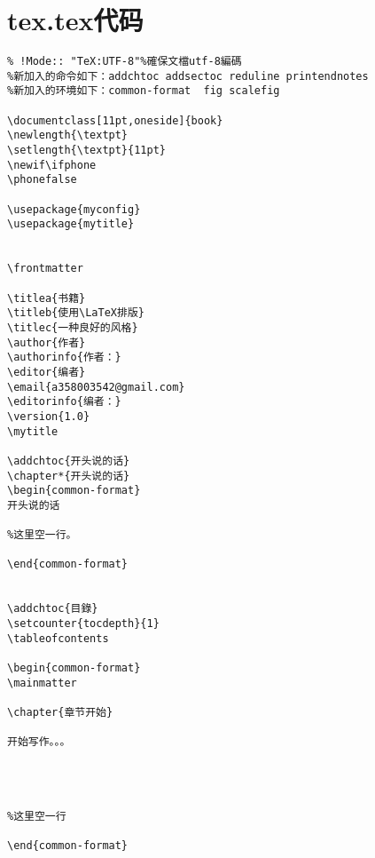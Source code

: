 \section{tex.tex代码}
\begin{verbatim}
% !Mode:: "TeX:UTF-8"%確保文檔utf-8編碼
%新加入的命令如下：addchtoc addsectoc reduline printendnotes 
%新加入的环境如下：common-format  fig scalefig 

\documentclass[11pt,oneside]{book}
\newlength{\textpt}
\setlength{\textpt}{11pt} 
\newif\ifphone
\phonefalse

\usepackage{myconfig}
\usepackage{mytitle}


\frontmatter   

\titlea{书籍}
\titleb{使用\LaTeX排版}
\titlec{一种良好的风格}
\author{作者}
\authorinfo{作者：}
\editor{编者}
\email{a358003542@gmail.com}
\editorinfo{编者：}
\version{1.0}
\mytitle

\addchtoc{开头说的话}
\chapter*{开头说的话}
\begin{common-format}
开头说的话

%这里空一行。

\end{common-format}


\addchtoc{目錄}
\setcounter{tocdepth}{1}    
\tableofcontents

\begin{common-format}
\mainmatter 

\chapter{章节开始}

开始写作。。。




%这里空一行

\end{common-format}  





\end{verbatim}


